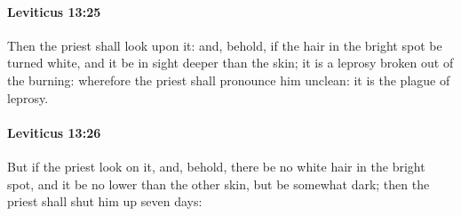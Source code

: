 		\paragraph{Leviticus 13:25} %
			\label{LEVITICUS-13-25}

			Then the priest shall look upon it: and, behold, if the hair in the bright spot be turned white, and it be in sight deeper than the skin; it is a leprosy broken out of the burning: wherefore the priest shall pronounce him unclean: it is the plague of leprosy.


		\paragraph{Leviticus 13:26} %
			\label{LEVITICUS-13-26}

			But if the priest look on it, and, behold, there be no white hair in the bright spot, and it be no lower than the other skin, but be somewhat dark; then the priest shall shut him up seven days:


